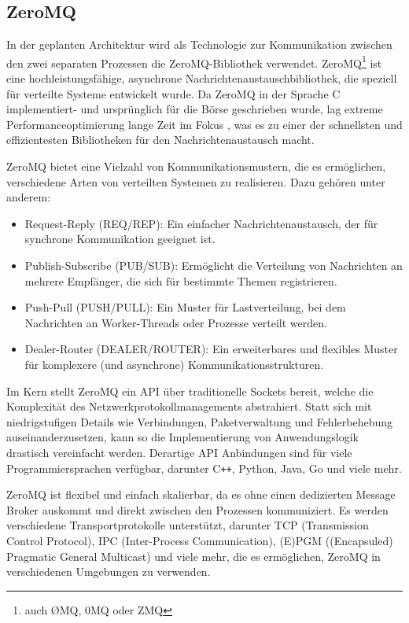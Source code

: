 \subsection{ZeroMQ}
\label{sec:zeromq}

In der geplanten Architektur wird als Technologie zur Kommunikation zwischen den zwei separaten Prozessen die ZeroMQ-Bibliothek \cite{hintjens2013zeromq} verwendet.
ZeroMQ\footnote{auch ØMQ, 0MQ oder ZMQ} ist eine hochleistungsfähige, asynchrone Nachrichtenaustauschbibliothek, die speziell für verteilte Systeme entwickelt wurde.
Da ZeroMQ in der Sprache C implementiert- und ursprünglich für die Börse geschrieben wurde, lag extreme Performanceoptimierung lange Zeit im Fokus \cite{sustrik2015zeromq},
was es zu einer der schnellsten und effizientesten Bibliotheken für den Nachrichtenaustausch macht.

ZeroMQ bietet eine Vielzahl von Kommunikationsmustern, die es ermöglichen, verschiedene Arten von verteilten Systemen zu realisieren.
Dazu gehören unter anderem:

\begin{itemize}
    \item Request-Reply (REQ/REP): Ein einfacher Nachrichtenaustausch, der für synchrone Kommunikation geeignet ist.
    \item Publish-Subscribe (PUB/SUB): Ermöglicht die Verteilung von Nachrichten an mehrere Empfänger, die sich für bestimmte Themen registrieren.
    \item Push-Pull (PUSH/PULL): Ein Muster für Lastverteilung, bei dem Nachrichten an Worker-Threads oder Prozesse verteilt werden.
    \item Dealer-Router (DEALER/ROUTER): Ein erweiterbares und flexibles Muster für komplexere (und asynchrone) Kommunikationsstrukturen.
\end{itemize}

Im Kern stellt ZeroMQ ein API über traditionelle Sockets bereit, welche die Komplexität des Netzwerkprotokollmanagements abstrahiert.
Statt sich mit niedrigstufigen Details wie Verbindungen, Paketverwaltung und Fehlerbehebung auseinanderzusetzen, kann so die Implementierung von Anwendungslogik drastisch vereinfacht werden.
Derartige API Anbindungen sind für viele Programmiersprachen verfügbar, darunter C\texttt{++}, Python, Java, Go und viele mehr.

ZeroMQ ist flexibel und einfach skalierbar, da es ohne einen dedizierten Message Broker auskommt und direkt zwischen den Prozessen kommuniziert.
Es werden verschiedene Transportprotokolle unterstützt, darunter TCP (Transmission Control Protocol), IPC (Inter-Process Communication), (E)PGM ((Encapsuled) Pragmatic General Multicast) und viele mehr, die es ermöglichen, ZeroMQ in verschiedenen Umgebungen zu verwenden.

